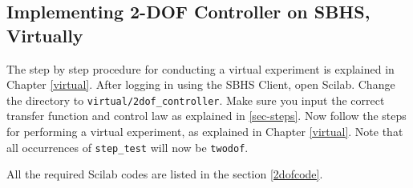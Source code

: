 \subsection{Implementing 2-DOF Controller on SBHS, Virtually}
The step by step procedure for conducting a virtual experiment is explained in Chapter \ref{virtual}. 
After logging in using the SBHS Client, open Scilab. Change the directory to {\tt virtual/2dof\_controller}.
Make sure you input the correct transfer function and control law as explained in \ref{sec-steps}. Now follow the 
steps for performing a virtual experiment, as explained in Chapter \ref{virtual}. Note that all occurrences of
{\tt step\_test} will now be {\tt twodof}.

All the required Scilab codes are listed in the section \ref{2dofcode}.

